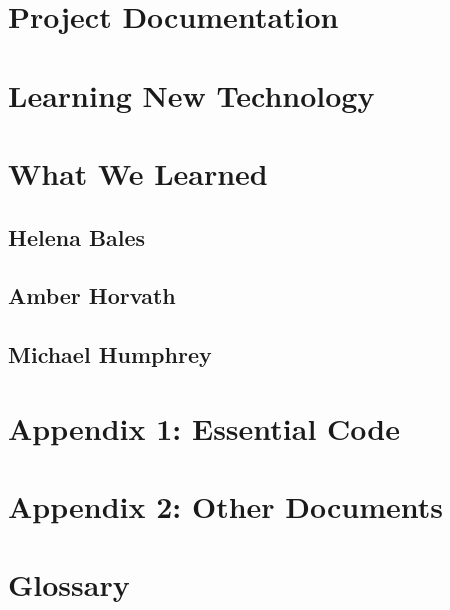 \documentclass[letterpaper,10pt]{article}
\begin{document}
\section{Project Documentation}


\section{Learning New Technology}


\section{What We Learned}
\subsection{Helena Bales}

\subsection{Amber Horvath}

\subsection{Michael Humphrey}


\section{Appendix 1: Essential Code}


\section{Appendix 2: Other Documents}


\section{Glossary}
\glsaddall
\printglossaries
\end{document}
